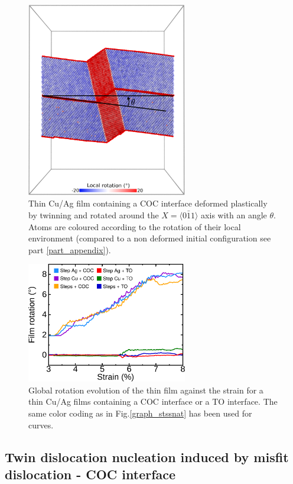 \documentclass[final,3p,times,twocolumn]{elsarticle}
\begin{document}
\begin{figure}[!h]
	\begin{center}
		\includegraphics[width=70mm]{Pic/graph_res_rot_fig3.eps} 
	\end{center}\caption{Thin Cu/Ag film containing a COC interface deformed plastically by twinning and rotated around the $X=\langle0\bar{1}1\rangle$ axis with an angle $\theta$. Atoms are coloured according to the rotation of their local environment (compared to a non deformed initial configuration see part \ref{part_appendix}).}\label{graph_res_rot}
\end{figure}

\begin{figure}[!h]
	\begin{center}
		\includegraphics[width=70mm]{Pic/graph_rotation.eps} 
	\end{center}\caption{Global rotation evolution of the thin film against the strain for a thin Cu/Ag films containing a COC interface or a TO interface. The same color coding as in Fig.\ref{graph_stssnat} has been used for curves.}\label{graph_rotation}
\end{figure}

	\subsection{Twin dislocation nucleation induced by misfit dislocation - COC interface}\label{subsubpart_twin}
	
\end{document}
